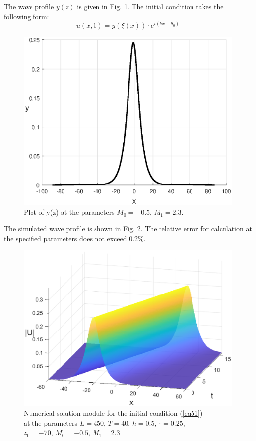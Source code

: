 \documentclass[preprint,12pt]{elsarticle}
\begin{document}
The wave profile \(y(z)\) is given in Fig. \ref{fig8}. The initial condition takes the following form:
\begin{equation}\label{eq51}
u(x,0)=y\left(\xi(x)\right)\cdot e^{i(kx-\theta_{0})}
\end{equation}
\begin{figure}[H]
\center
\includegraphics[width=0.5\linewidth]{fig10.eps}
\caption{Plot of y(z) at the parameters \(M_{0}=-0.5,\, M_{1}=2.3.\)}
\label{fig8}
\end{figure}

The simulated wave profile is shown in Fig. \ref{fig9}. The relative error for calculation at the specified parameters does not exceed 0.2\%.
\begin{figure}[H] %
\begin{center}
\includegraphics[width=0.5\linewidth]{fig11.eps}
\end{center}
\caption{Numerical solution module for the initial condition (\ref{eq51})\\
at the parameters
\(L=450,\, T=40,\, h=0.5,\, \tau=0.25\), 
\(z_{0}=-70,\, M_{0}=-0.5,\, M_{1}=2.3\)}
\label{fig9}
\end{figure}
\end{document}
